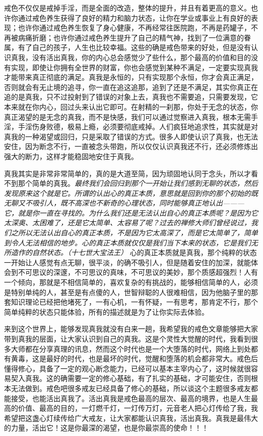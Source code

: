 戒色不仅仅是戒掉手淫，而是全面的改造，整体的提升，并且有着更高的意义。也许你通过戒色养生获得了良好的精力和脑力状态，让你在学业或事业上有良好的表现；也许你通过戒色养生恢复了身心健康，不再经常往医院跑，不再是药罐子，不再被病痛折磨；也许你通过戒色养生提升了自己的精气神，找到了一位满意的眷属，有了自己的孩子，人生也比较幸福。这些的确是戒色带来的好处，但是没有认识真我，没有活出真我，你的内心总会感觉少了些什么，那个最高的价值和目的没有实现，即使让你拥有全世界的财富，你也会感觉到某种不满足，一定要实现真我才能带来真正彻底的满足。真我是永恒的，只有实现那个永恒，你才会真正满足，否则就会有无止境的追寻，你一直在追这追那，追到了还是不满足，其实你真正在追的是真我，只不过投射到了错误的对象上去，真我也不需要追，只需要发现，它本来就在你内心，回过头来认出它即可。在射精的一刹那，你处于无念的状态，你真正渴望的是无念的真我，而不是快感，我们可以通过觉察进入真我，根本无需手淫，手淫伤身败德，极易上瘾，必须要彻底戒掉。人们疯狂地追求性，其实就是对真我的一种渴望或回归，只是采取了错误的方式。很多人即使认识了真我，也无法安住，因为断念不行，一直被念头带跑，所以仅仅认识真我还不行，还必须修炼出强大的断力，这样才能稳固地安住于真我。

真我其实是非常非常简单的，真的是大道至简，因为顽固地认同于念头，所以才看不到那个简单的真我。\textit{最终我们会回归到那个一开始让我们感到无聊的状态，然后发现原来这个就是它。所谓的认出心的真正本质，意思就是回到你的那个初始的既无聊又不吸引人，既不高深也不新奇的心理状态，同时能够真正地认出———它，就是你一直在寻找的。为什么我们还是无法认出自心的真正本质呢？是因为它太深奥、太困难了，还是它太简单、太容易了呢？过去的禅修大师们曾经说过，我们之所以无法认出自心的真正本质，不是因为它太高深了，而是它太简单了，简单到令人无法相信的地步。心的真正本质就仅仅是我们当下本来的状态，它是我们无所造作的自然状态。（十七世大宝法王）} 心的真正本质就是真我，那个纯粹的状态一开始让人感觉有点无聊，很平淡，的确不吸引人，但是随着安住的加深，就能体会到不可思议的深邃，不可思议的真味，不可思议的美妙，那个质感超强烈！人有一个倾向，那就是不相信简单的，喜欢复杂的有挑战的，能够相信简单的人，必须是特别单纯的人，甚至是有点傻的人，世智辩聪的人很难相信，因为他脑子里的那套知识理论已经把他堵死了，一有心机，一有怀疑，一有思考，那肯定不行，那个简单纯粹的状态只能体验，所有的描述就是为了让你实际去体验。

来到这个世界上，能够发现真我就没有白来一趟，我希望我的戒色文章能够把大家带到真我的层面，让大家认识到自己的真我。这是个灵性大觉醒的时代，我看到很多大师都在分享真理的讯息，然而这个时代也是一个大堕落的时代，网络上到处都有黄毒，这是最好的时代，也是最坏的时代，觉醒和堕落的机会都非常大。戒色后懂得修心，具备了一定的观心断念能力，已经可以基本主宰内心了，这时候就很容易契入真我。这的确需要一定的修心基础，有了扎实的基础，才可能安住，否则根本无法做到。戒色吧很多戒友已经具备了修心的基础，所以谈这个主题很多戒友都能接受，也能活出真我了。活出真我是戒色最高的层次、最高的境界，也是人生最高的价值、最高的目的，一灯燃千灯，一灯传万灯，元音老人把心灯传给了我，我希望把这盏心灯续传给广大戒友，让大家都能认识真我，活出真我。真我是最伟大的力量，活出它！这是你最深的渴望，也是你最崇高的使命！！！

